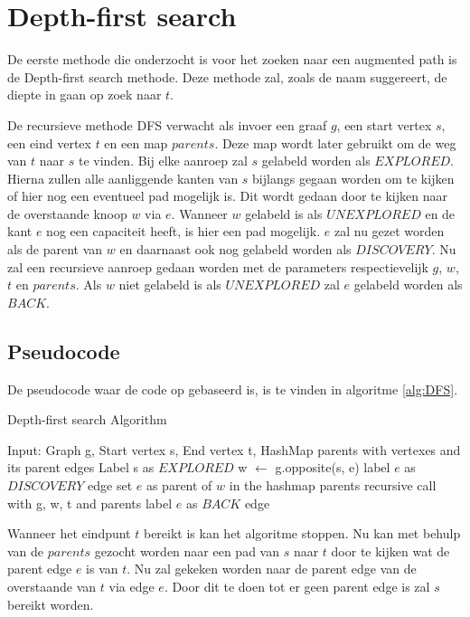 \chapter{Depth-first search}
\label{chap:depthfirst}

De eerste methode die onderzocht is voor het zoeken naar een augmented path is de Depth-first search methode. Deze methode zal, zoals de naam suggereert, de diepte in gaan op zoek naar $t$. 

De recursieve methode DFS verwacht als invoer een graaf $g$, een start vertex $s$, een eind vertex $t$ en een map $parents$. Deze map wordt later gebruikt om de weg van $t$ naar $s$ te vinden. Bij elke aanroep zal $s$ gelabeld worden als $EXPLORED$. Hierna zullen alle aanliggende kanten van $s$ bijlangs gegaan worden om te kijken of hier nog een eventueel pad mogelijk is. Dit wordt gedaan door te kijken naar de overstaande knoop $w$ via $e$. Wanneer $w$ gelabeld is als $UNEXPLORED$ en de kant $e$ nog een capaciteit heeft, is hier een pad mogelijk. $e$ zal nu gezet worden als de parent van $w$ en daarnaast ook nog gelabeld worden als $DISCOVERY$. Nu zal een recursieve aanroep gedaan worden met de parameters respectievelijk $g$, $w$, $t$ en $parents$.
Als $w$ niet gelabeld is als $UNEXPLORED$ zal $e$ gelabeld worden als $BACK$.

\section{Pseudocode}
De pseudocode waar de code op gebaseerd is, is te vinden in algoritme \ref{alg:DFS}.

\begin{algorithm}[h]
\caption{Depth-first search Algorithm}
\label{alg:DFS}
\begin{algorithmic}
\REQUIRE Input: Graph g, Start vertex s, End vertex t, HashMap parents with vertexes and its parent edges
\STATE Label s as $EXPLORED$
\STATE w $\gets$ g.opposite(s, e)
\STATE label $e$ as $DISCOVERY$ edge
\STATE set $e$ as parent of $w$ in the hashmap parents
\STATE recursive call with g, w, t and parents
\ELSE
\STATE label $e$ as $BACK$ edge
\ENDIF
\ENDIF
\ENDFOR
\end{algorithmic}
\end{algorithm}

Wanneer het eindpunt $t$ bereikt is kan het algoritme stoppen. Nu kan met behulp van de $parents$ gezocht worden naar een pad van $s$ naar $t$ door te kijken wat de parent edge $e$ is van $t$. Nu zal gekeken worden naar de parent edge van de overstaande van $t$ via edge $e$. Door dit te doen tot er geen parent edge is zal $s$ bereikt worden.